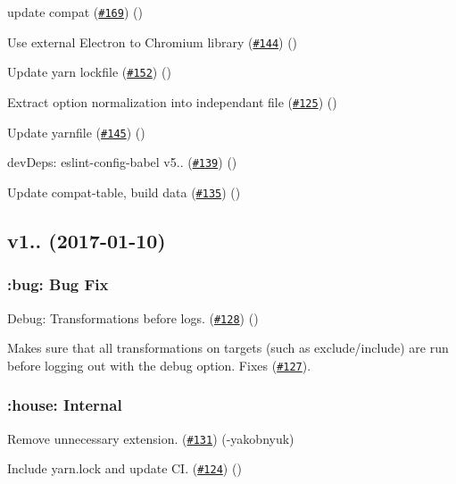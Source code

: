 \begin{DoxyItemize}
\item update compat (\href{https://github.com/babel/babel-preset-env/pull/169}{\tt \#169}) ()
\item Use external Electron to Chromium library (\href{https://github.com/babel/babel-preset-env/pull/144}{\tt \#144}) ()
\item Update yarn lockfile (\href{https://github.com/babel/babel-preset-env/pull/152}{\tt \#152}) ()
\item Extract option normalization into independant file (\href{https://github.com/babel/babel-preset-env/pull/125}{\tt \#125}) ()
\item Update yarnfile (\href{https://github.com/babel/babel-preset-env/pull/145}{\tt \#145}) ()
\item dev\+Deps\+: eslint-\/config-\/babel v5.. (\href{https://github.com/babel/babel-preset-env/pull/139}{\tt \#139}) ()
\item Update compat-\/table, build data (\href{https://github.com/babel/babel-preset-env/pull/135}{\tt \#135}) ()
\end{DoxyItemize}

\subsection*{v1.. (2017-\/01-\/10)}

\subsubsection*{\+:bug\+: Bug Fix}


\begin{DoxyItemize}
\item Debug\+: Transformations before logs. (\href{https://github.com/babel/babel-preset-env/pull/128}{\tt \#128}) ()
\end{DoxyItemize}

Makes sure that all transformations on {\ttfamily targets} (such as {\ttfamily exclude}/{\ttfamily include}) are run before logging out with the {\ttfamily debug} option. Fixes (\href{https://github.com/babel/babel-preset-env/issues/127}{\tt \#127}).

\subsubsection*{\+:house\+: Internal}


\begin{DoxyItemize}
\item Remove unnecessary extension. (\href{https://github.com/babel/babel-preset-env/pull/131}{\tt \#131}) (-\/yakobnyuk)
\item Include yarn.\+lock and update CI. (\href{https://github.com/babel/babel-preset-env/pull/124}{\tt \#124}) ()
\end{DoxyItemize}

